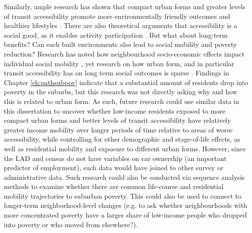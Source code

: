 Similarly, ample research has shown that compact urban forms and greater levels of transit accessibility promote more environmentally friendly outcomes and healthier lifestyles \cite{ewing_compactness_2015,ewing_travel_2010,cervero_travel_1997}. There are also theoretical arguments that accessibility is a social good, as it enables activity participation \cite{martens_transport_2016,pereira_distributive_2017}. But what about long-term benefits? Can such built environments also lead to social mobility and poverty reduction? Research has noted how neighbourhood socio-economic effects impact individual social mobility \cite{chetty_effects_2016}, yet research on how urban form, and in particular transit accessibility has on long term social outcomes is sparse \cite{ewing_does_2016,fransen_relationship_2019}. Findings in Chapter \ref{ch:pathsubpov} indicate that a substantial amount of residents drop into poverty in the suburbs, but this research was not directly asking why and how this is related to urban form. As such, future research could use similar data in this dissertation to uncover whether low-income residents exposed to more compact urban forms and better levels of transit accessibility have relatively greater income mobility over longer periods of time relative to areas of worse accessibility, while controlling for other demographic and stage-of-life effects, as well as residential mobility and exposure to different urban forms. However, since the LAD and census do not have variables on car ownership (an important predictor of employment), such data would have joined to other survey or administrative data. Such research could also be conducted via sequence analysis methods to examine whether there are common life-course and residential mobility trajectories to suburban poverty. This could also be used to connect to longer-term neighborhood-level changes (e.g. to ask whether neighbourhoods with more concentrated poverty have a larger share of low-income people who dropped into poverty or who moved from elsewhere?). 

